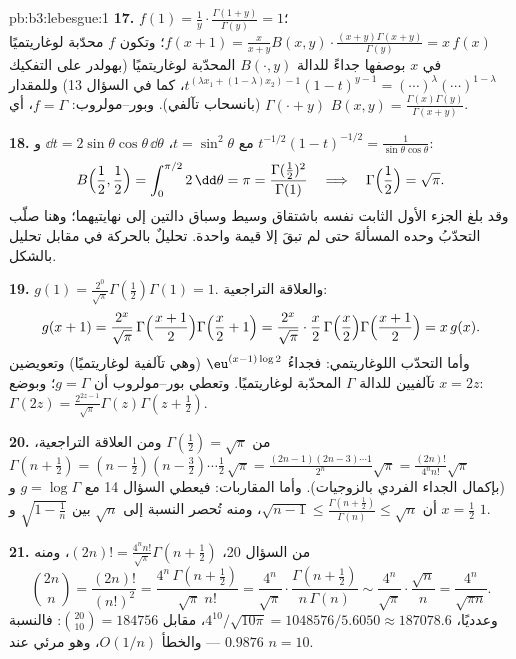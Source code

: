 \begin{solution}{pb:b3:lebesgue:1}
\textbf{17.} $f(1) = \frac1y\cdot\frac{\Gamma(1+y)}{\Gamma(y)}
= 1$؛ $f(x+1) = \frac{x}{x+y}B(x,y)\cdot\frac{(x+y)\Gamma(x+y)}
{\Gamma(y)} = x\,f(x)$؛ وتكون $f$ محدّبة لوغاريتميًا في
$x$ بوصفها جداءً للدالة $B(\cdot, y)$ المحدّبة لوغاريتميًا
(بهولدر على التفكيك $t^{(\lambda x_1 + (1-\lambda)x_2)-1}(1-t)^{y-1}
= (\cdots)^\lambda(\cdots)^{1-\lambda}$، كما في السؤال 13) وللمقدار $\Gamma(\cdot + y)$
(بانسحاب تآلفي). وبور--مولروب: $f =
\Gamma$، أي $B(x, y) =
\frac{\Gamma(x)\Gamma(y)}{\Gamma(x+y)}$.

\textbf{18.} مع $t = \sin^2\theta$، $\dd t =
2\sin\theta\cos\theta\,\dd\theta$ و $t^{-1/2}(1-t)^{-1/2} =
\frac1{\sin\theta\cos\theta}$:
\[
B\Bigl(\frac12, \frac12\Bigr) =
\int_0^{\pi/2}2\,\dd\theta = \pi
= \frac{\Gamma(\frac12)^2}{\Gamma(1)}
\quad\Longrightarrow\quad
\Gamma\Bigl(\frac12\Bigr) = \sqrt\pi .
\]
وقد بلغ الجزء الأول الثابت نفسه باشتقاق وسيط وسباق دالتين إلى
نهايتيهما؛ وهنا صلّب التحدّبُ وحده المسألةَ حتى لم تبقَ إلا
قيمة واحدة. تحليلٌ بالحركة في مقابل تحليل بالشكل.

\textbf{19.} $g(1) = \frac{2^0}{\sqrt\pi}\Gamma(\frac12)
\Gamma(1) = 1$. والعلاقة التراجعية:
\[
g(x+1) = \frac{2^{x}}{\sqrt\pi}\,
\Gamma\Bigl(\frac{x+1}2\Bigr)\Gamma\Bigl(\frac x2 + 1\Bigr)
= \frac{2^{x}}{\sqrt\pi}\cdot\frac x2\,
\Gamma\Bigl(\frac x2\Bigr)\Gamma\Bigl(\frac{x+1}2\Bigr)
= x\,g(x) .
\]
وأما التحدّب اللوغاريتمي: فجداءُ $\eu^{(x-1)\log2}$ (وهي تآلفية
لوغاريتميًا) وتعويضين تآلفيين للدالة $\Gamma$ المحدّبة
لوغاريتميًا. وتعطي بور--مولروب أن $g = \Gamma$؛ وبوضع $x = 2z$:
$\Gamma(2z) = \frac{2^{2z-1}}{\sqrt\pi}\Gamma(z)\Gamma(z +
\frac12)$.

\textbf{20.} من $\Gamma(\frac12) = \sqrt\pi$ ومن العلاقة التراجعية، $\Gamma(n + \frac12) = (n - \frac12)(n -
\frac32)\cdots\frac12\,\sqrt\pi =
\frac{(2n-1)(2n-3)\cdots1}{2^n}\sqrt\pi =
\frac{(2n)!}{4^nn!}\sqrt\pi$ (بإكمال
الجداء الفردي بالزوجيات). وأما المقاربات: فيعطي السؤال 14 مع
$g = \log\Gamma$ و $x = \frac12$ أن $\sqrt{n-1} \leq
\frac{\Gamma(n+\frac12)}{\Gamma(n)} \leq \sqrt n$، ومنه تُحصر النسبة
إلى $\sqrt n$ بين $\sqrt{1 - \frac1n}$ و $1$.

\textbf{21.} من السؤال 20، $(2n)! =
\frac{4^nn!}{\sqrt\pi}\Gamma(n + \tfrac12)$، ومنه
\[
\binom{2n}n = \frac{(2n)!}{(n!)^2}
= \frac{4^n\,\Gamma(n+\frac12)}{\sqrt\pi\;n!}
= \frac{4^n}{\sqrt\pi}\cdot
\frac{\Gamma(n+\frac12)}{n\,\Gamma(n)}
\sim \frac{4^n}{\sqrt\pi}\cdot\frac{\sqrt n}{n}
= \frac{4^n}{\sqrt{\pi n}} .
\]
وعدديًا، $4^{10}/\sqrt{10\pi} = 1048576/5.6050 \approx
187078.6$، مقابل $\binom{20}{10} = 184756$: فالنسبة $0.9876$ --- والخطأ
$O(1/n)$، وهو مرئي عند $n = 10$.


\end{solution}
